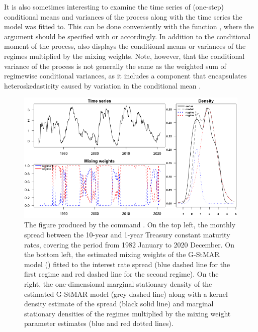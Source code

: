 \documentclass[nojss]{jss} %
\begin{document}
It is also sometimes interesting to examine the time series of (one-step) conditional means and variances of the process along with the time series the model was fitted to. This can be done conveniently with the function , where the argument  should be specified with  or  accordingly. In addition to the conditional moment of the process,  also displays the conditional means or variances of the regimes multiplied by the mixing weights. Note, however, that the conditional variance of the process is not generally the same as the weighted sum of regimewise conditional variances, as it includes a component that encapsulates heteroskedasticity caused by variation in the conditional mean \cite[see][Equation (2.19)]{Virolainen:2020}.

\begin{figure}[p]
  \centering
  \includegraphics{figures/plotfit42gs.png}
  \caption{The figure produced by the command . On the top left, the monthly spread between the 10-year and 1-year Treasury constant maturity rates, covering the period from 1982 January to 2020 December. On the bottom left, the estimated mixing weights of the G-StMAR model () fitted to the interest rate spread (blue dashed line for the first regime and red dashed line for the second regime). On the right, the one-dimensional marginal stationary density of the estimated G-StMAR model (grey dashed line) along with a kernel density estimate of the spread (black solid line) and marginal stationary densities of the regimes multiplied by the mixing weight parameter estimates (blue and red dotted lines).}
\label{fig:fit42gs}
\end{figure}
\end{document}
